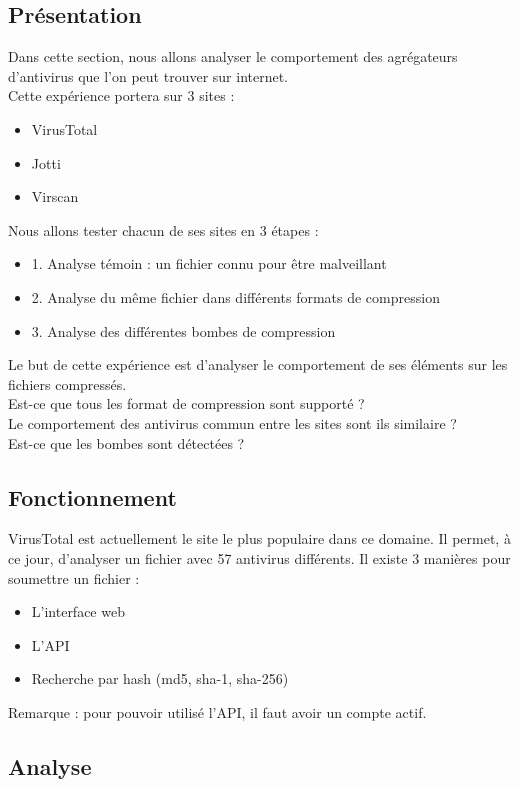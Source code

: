\documentclass[smallextended]{svjour3}       %
\begin{document}
\subsection{Présentation}
\label{agrégateurs:présentation}
Dans cette section, nous allons analyser le comportement des agrégateurs d'antivirus que l'on peut trouver sur internet.\\
Cette expérience portera sur 3 sites : 
\begin{itemize}
\item VirusTotal \cite{virustotal}
\item Jotti \cite{Jotti}
\item Virscan \cite{Virscan}
\end{itemize}
Nous allons tester chacun de ses sites en 3 étapes :
\begin{itemize}
\item 1. Analyse témoin : un fichier connu pour être malveillant
\item 2. Analyse du même fichier dans différents formats de compression
\item 3. Analyse des différentes bombes de compression
\end{itemize}
Le but de cette expérience est d'analyser le comportement de ses éléments sur les fichiers compressés.\\
Est-ce que tous les format de compression sont supporté ?\\
Le comportement des antivirus commun entre les sites sont ils similaire ?\\
Est-ce que les bombes sont détectées ?\\

\subsection{Fonctionnement}
\label{agrégateurs:fonctionnement}
VirusTotal est actuellement le site le plus populaire dans ce domaine. Il permet, à ce jour, d'analyser un fichier avec 57 antivirus différents. Il existe 3 manières pour soumettre un fichier :
\begin{itemize}
\item L'interface web
\item L'API
\item Recherche par hash (md5, sha-1, sha-256) 
\end{itemize}
Remarque : pour pouvoir utilisé l'API, il faut avoir un compte actif.
\subsection{Analyse}
\label{agrégateurs:analyse}
\end{document}
